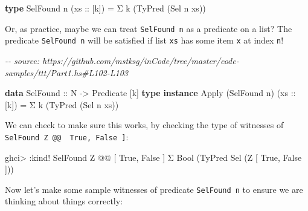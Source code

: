 \documentclass[]{article}
\newenvironment{Shaded}{}{}
\newcommand{\CommentTok}[1]{\textcolor[rgb]{0.38,0.63,0.69}{\textit{#1}}}
\newcommand{\DataTypeTok}[1]{\textcolor[rgb]{0.56,0.13,0.00}{#1}}
\newcommand{\KeywordTok}[1]{\textcolor[rgb]{0.00,0.44,0.13}{\textbf{#1}}}
\newcommand{\NormalTok}[1]{#1}
\newcommand{\OperatorTok}[1]{\textcolor[rgb]{0.40,0.40,0.40}{#1}}
\newcommand{\OtherTok}[1]{\textcolor[rgb]{0.00,0.44,0.13}{#1}}
\begin{document}
\begin{Shaded}
\begin{Highlighting}[]
\KeywordTok{type} \DataTypeTok{SelFound}\NormalTok{ n (}\OtherTok{xs ::}\NormalTok{ [k]) }\OtherTok{=}\NormalTok{ Σ k (}\DataTypeTok{TyPred}\NormalTok{ (}\DataTypeTok{Sel}\NormalTok{ n xs))}
\end{Highlighting}
\end{Shaded}

Or, as practice, maybe we can treat \texttt{SelFound\ n} as a predicate on a
list? The predicate \texttt{SelFound\ n} will be satisfied if list \texttt{xs}
has some item \texttt{x} at index \texttt{n}!

\begin{Shaded}
\begin{Highlighting}[]
\CommentTok{{-}{-} source: https://github.com/mstksg/inCode/tree/master/code{-}samples/ttt/Part1.hs\#L102{-}L103}

\KeywordTok{data} \DataTypeTok{SelFound}\OtherTok{ ::} \DataTypeTok{N} \OtherTok{{-}>} \DataTypeTok{Predicate}\NormalTok{ [k]}
\KeywordTok{type} \KeywordTok{instance} \DataTypeTok{Apply}\NormalTok{ (}\DataTypeTok{SelFound}\NormalTok{ n) (}\OtherTok{xs ::}\NormalTok{ [k]) }\OtherTok{=}\NormalTok{ Σ k (}\DataTypeTok{TyPred}\NormalTok{ (}\DataTypeTok{Sel}\NormalTok{ n xs))}
\end{Highlighting}
\end{Shaded}

We can check to make sure this works, by checking the type of witnesses of
\texttt{SelFound\ \textquotesingle{}Z\ @@\ \textquotesingle{}{[}\ \textquotesingle{}True,\ \textquotesingle{}False\ {]}}:

\begin{Shaded}
\begin{Highlighting}[]
\NormalTok{ghci}\OperatorTok{>} \OperatorTok{:}\NormalTok{kind}\OperatorTok{!} \DataTypeTok{SelFound} \DataTypeTok{\textquotesingle{}Z} \OperatorTok{@@}\NormalTok{ \textquotesingle{}[ }\DataTypeTok{\textquotesingle{}True}\NormalTok{, }\DataTypeTok{\textquotesingle{}False}\NormalTok{ ]}
\NormalTok{Σ }\DataTypeTok{Bool}\NormalTok{ (}\DataTypeTok{TyPred} \DataTypeTok{Sel}\NormalTok{ (}\DataTypeTok{\textquotesingle{}Z}\NormalTok{ \textquotesingle{}[ }\DataTypeTok{\textquotesingle{}True}\NormalTok{, }\DataTypeTok{\textquotesingle{}False}\NormalTok{ ]))}
\end{Highlighting}
\end{Shaded}

Now let's make some sample witnesses of predicate \texttt{SelFound\ n} to ensure
we are thinking about things correctly:
\end{document}
